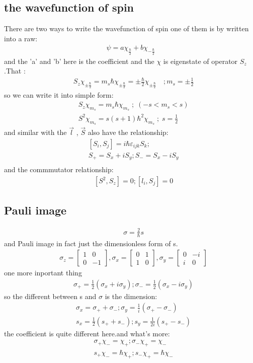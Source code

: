 \documentclass{article}
\begin{document}
\subsection{the wavefunction of spin}
There are two ways to write the wavefunction of spin one of them is by written into a raw:\begin{align}\psi=a\chi_{\frac{\hbar}2}+b\chi_{-\frac{\hbar}2}\end{align}and the 'a' and 'b' here is the coefficient and the $\chi$ is eigenstate of operator $S_z$.That :
\begin{align}
&S_z\chi_{\pm\frac{\hbar}2}=m_s\hbar\chi_{\pm\frac{\hbar}2}=\pm\frac{\hbar}2\chi_{\pm\frac{\hbar}2}\quad;m_s=\pm\frac{1}2
\end{align}
so we can write it into simple form:
\begin{align}
&S_z\chi_{m_s}=m_s\hbar\chi_{m_s}\;;\;(-s<m_s<s)\\
&S^2\chi_{m_s}=s(s+1)\hbar^2\chi_{m_s}\;;\;s=\frac12
\end{align}
and similar with the $\vec l$ , $\vec S$ also have the relationship:
\begin{align*}
&[S_i,S_j]=i\hbar\varepsilon_{ijk}S_k; \\
&S_+=S_x+iS_y;S_-=S_x-iS_y\\
\end{align*}
and the commmutator relationship:
\begin{align}
&[S^2,S_z]=0;[l_i,S_j]=0
\end{align}
\subsection{Pauli image}
\begin{align}
&\sigma=\frac{2}{\hbar}s
\end{align}
and Pauli image in fact just the dimensionless form of s.
\begin{align}                                            
&\sigma_z=\begin{bmatrix}1&0\\0&-1\end{bmatrix},\sigma_x=\begin{bmatrix}0&1\\1&0\end{bmatrix},\sigma_y=\begin{bmatrix}0&-i\\i&0\end{bmatrix}
\end{align}
one more inportant thing \begin{align}&\sigma_+=\frac12(\sigma_x+i\sigma_y);\sigma_-=\frac12(\sigma_x-i\sigma_y)\end{align}
so the different between s and $\sigma$ is the dimension:
\begin{align}
&\sigma_x=\sigma_++\sigma_-;\sigma_y=\frac1i(\sigma_+-\sigma_-)\\
&s_x=\frac12(s_++s_-);s_y=\frac1{2i}(s_+-s_-)
\end{align}
the coefficient is quite different here.and what's more:
\begin{align}
 &\sigma_+\chi_{-}=\chi_+;\sigma_-\chi_+=\chi_-\\
 &s_+\chi_-=\hbar\chi_+;s_-\chi_+=\hbar \chi_-
\end{align}
\end{document}

